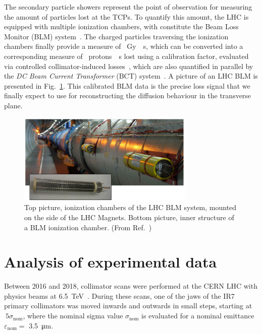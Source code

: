 The secondary particle showers represent the point of observation for measuring the amount of particles lost at the TCPs. To quantify this amount, the LHC is equipped with multiple ionization chambers, with constitute the Beam Loss Monitor (BLM) system~\cite{blmSystem1, blmSystem2}. The charged particles traversing the ionization chambers finally provide a measure of \SI{}{Gy \per s}, which can be converted into a corresponding measure of \SI{}{protons \per s} lost using a calibration factor, evaluated via controlled collimator-induced losses~\cite{arek}, which are also quantified in parallel by the \textit{DC Beam Current Transformer} (BCT) system~\cite{Denard:1213275}. A picture of an LHC BLM is presented in Fig.~\ref{fig:blm}. This calibrated BLM data is the precise loss signal that we finally expect to use for reconstructing the diffusion behaviour in the transverse plane.

\begin{figure}[hpt]
    \centering
    \includegraphics[width=0.75\textwidth]{5_Diffusion_measurement_LHC/figs/blm.png}
    \caption{Top picture, ionization chambers of the LHC BLM system, mounted on the side of the LHC Magnets. Bottom picture, inner structure of a BLM ionization chamber. (From Ref.~\cite{blmonline})}
    \label{fig:blm}
\end{figure}


%
\section{Analysis of experimental data}
%

Between 2016 and 2018, collimator scans were performed at the CERN LHC with physics beams at \SI{6.5}{TeV}~\cite{PhysRevAccelBeams.23.044802}. During these scans, one of the jaws of the IR7 primary collimators was moved inwards and outwards in small steps, starting at $~5\sigma_\text{nom}$, where the nominal sigma value $\sigma_\text{nom}$ is evaluated for a nominal emittance $\varepsilon_\text{nom} =$ \SI{3.5}{\micro\meter}.

